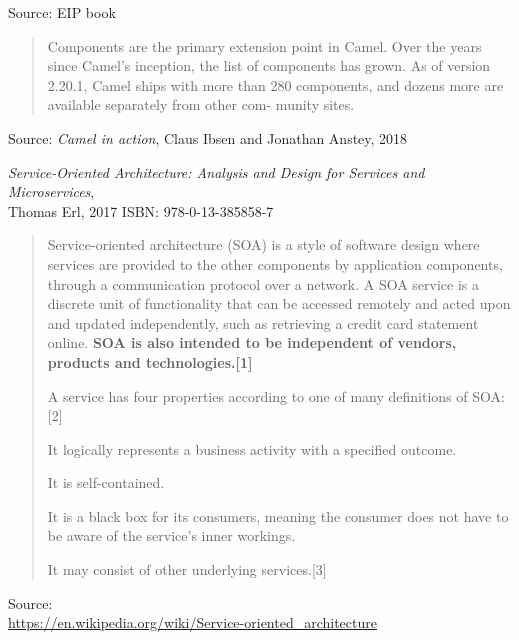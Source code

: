 \documentclass[Screen16to9,17pt]{foils}
\begin{document}
Source: EIP book



\begin{quote}
Components are the primary extension point in Camel. Over the years since Camel’s
inception, the list of components has grown. As of version 2.20.1, Camel ships with
more than 280 components, and dozens more are available separately from other com-
munity sites.
\end{quote}
Source: \emph{Camel in action}, Claus Ibsen and Jonathan Anstey, 2018







\emph{Service‑Oriented Architecture: Analysis and Design for Services and Microservices},\\ Thomas Erl, 2017
ISBN: 978-0-13-385858-7




\begin{quote}
Service-oriented architecture (SOA) is a style of software design where services are provided to the other components by application components, through a communication protocol over a network. A SOA service is a discrete unit of functionality that can be accessed remotely and acted upon and updated independently, such as retrieving a credit card statement online. {\bf SOA is also intended to be independent of vendors, products and technologies.[1]}

A service has four properties according to one of many definitions of SOA:[2]
\begin{list2}
\item It logically represents a business activity with a specified outcome.
\item It is self-contained.
\item It is a black box for its consumers, meaning the consumer does not have to be aware of the service's inner workings.
\item It may consist of other underlying services.[3]
\end{list2}
\end{quote}
Source:{\footnotesize\\
\url{https://en.wikipedia.org/wiki/Service-oriented_architecture}}
\end{document}
